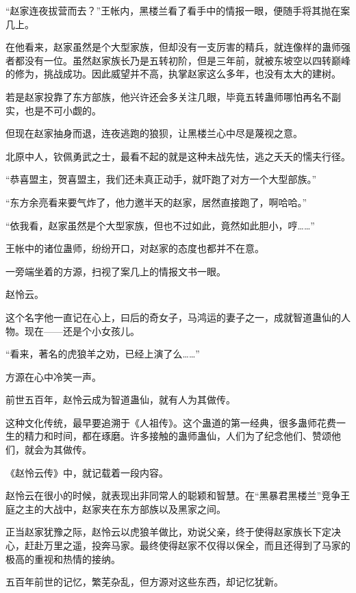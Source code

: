 
\begin{this_body}



“赵家连夜拔营而去？”王帐内，黑楼兰看了看手中的情报一眼，便随手将其抛在案几上。

在他看来，赵家虽然是个大型家族，但却没有一支厉害的精兵，就连像样的蛊师强者都没有一位。虽然赵家族长乃是五转初阶，但是三年前，就被东坡空以四转巅峰的修为，挑战成功。因此威望并不高，执掌赵家这么多年，也没有太大的建树。

若是赵家投靠了东方部族，他兴许还会多关注几眼，毕竟五转蛊师哪怕再名不副实，也是不可小觑的。

但现在赵家抽身而退，连夜逃跑的狼狈，让黑楼兰心中尽是蔑视之意。

北原中人，钦佩勇武之士，最看不起的就是这种未战先怯，逃之夭夭的懦夫行径。

“恭喜盟主，贺喜盟主，我们还未真正动手，就吓跑了对方一个大型部族。”

“东方余亮看来要气炸了，他力邀半天的赵家，居然直接跑了，啊哈哈。”

“依我看，赵家虽然是个大型家族，但也不过如此，竟然如此胆小，哼……”

王帐中的诸位蛊师，纷纷开口，对赵家的态度也都并不在意。

一旁端坐着的方源，扫视了案几上的情报文书一眼。

赵怜云。

这个名字他一直记在心上，曰后的奇女子，马鸿运的妻子之一，成就智道蛊仙的人物。现在——还是个小女孩儿。

“看来，著名的虎狼羊之劝，已经上演了么……”

方源在心中冷笑一声。

前世五百年，赵怜云成为智道蛊仙，就有人为其做传。

这种文化传统，最早要追溯于《人祖传》。这个蛊道的第一经典，很多蛊师花费一生的精力和时间，都在琢磨。许多接触的蛊师蛊仙，人们为了纪念他们、赞颂他们，就会为其做传。

《赵怜云传》中，就记载着一段内容。

赵怜云在很小的时候，就表现出非同常人的聪颖和智慧。在“黑暴君黑楼兰”竞争王庭之主的大战中，赵家夹在东方部族以及黑家之间。

正当赵家犹豫之际，赵怜云以虎狼羊做比，劝说父亲，终于使得赵家族长下定决心，赶赴万里之遥，投奔马家。最终使得赵家不仅得以保全，而且还得到了马家的极高的重视和热情的接纳。

五百年前世的记忆，繁芜杂乱，但方源对这些东西，却记忆犹新。


\end{this_body}
